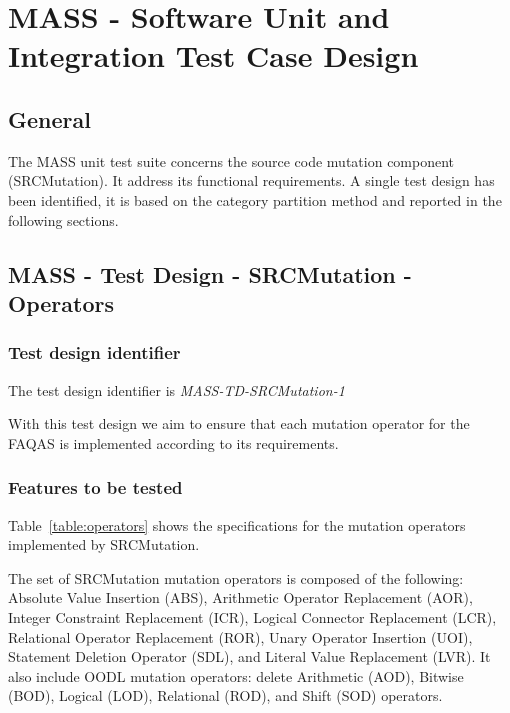
\chapter{MASS - Software Unit and Integration Test Case Design}
\label{chap:spec}


\section{General}

The MASS unit test suite concerns the source code mutation component (SRCMutation). It address its functional requirements. A single test design has been identified, it is based on the category partition method and reported in the following sections.



\section{MASS - Test Design - SRCMutation - Operators}

\subsection{Test design identifier}

The test design identifier is \emph{MASS-TD-SRCMutation-1}

With this test design we aim to ensure that each mutation operator for the FAQAS is implemented according to its requirements.

\subsection{Features to be tested}

Table~\ref{table:operators} shows the specifications for the mutation operators implemented by SRCMutation.

The set of SRCMutation mutation operators is composed of the following: Absolute Value Insertion (ABS), Arithmetic Operator Replacement (AOR), Integer Constraint Replacement (ICR), Logical Connector Replacement (LCR), Relational Operator Replacement (ROR), Unary Operator Insertion (UOI), Statement Deletion Operator (SDL), and Literal Value Replacement (LVR).
It also include OODL mutation operators: delete Arithmetic (AOD), Bitwise (BOD), Logical (LOD), Relational (ROD), and Shift (SOD) operators.



